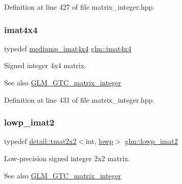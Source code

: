 Definition at line 427 of file matrix\+\_\+integer.\+hpp.

\mbox{\label{group__gtc__matrix__integer_ga367d8d5281ff82f1215a227dd2ea5ba9}} 
\subsubsection{\texorpdfstring{imat4x4}{imat4x4}}
{\footnotesize\ttfamily typedef \hyperlink{group__gtc__matrix__integer_gafa2df6be3aad055867b9bfea34e9c4a0}{mediump\+\_\+imat4x4} \hyperlink{group__gtc__matrix__integer_ga367d8d5281ff82f1215a227dd2ea5ba9}{glm\+::imat4x4}}

Signed integer 4x4 matrix. \begin{DoxySeeAlso}{See also}
\hyperlink{group__gtc__matrix__integer}{G\+L\+M\+\_\+\+G\+T\+C\+\_\+matrix\+\_\+integer} 
\end{DoxySeeAlso}


Definition at line 431 of file matrix\+\_\+integer.\+hpp.

\mbox{\label{group__gtc__matrix__integer_gae0df4bc278c1a958a32af9ac82c47630}} 
\subsubsection{\texorpdfstring{lowp\+\_\+imat2}{lowp\_imat2}}
{\footnotesize\ttfamily typedef \hyperlink{structglm_1_1detail_1_1tmat2x2}{detail\+::tmat2x2}$<$int, \hyperlink{namespaceglm_a0f04f086094c747d227af4425893f545ae161af3fc695e696ce3bf69f7332bc2d}{lowp}$>$ \hyperlink{group__gtc__matrix__integer_gae0df4bc278c1a958a32af9ac82c47630}{glm\+::lowp\+\_\+imat2}}

Low-\/precision signed integer 2x2 matrix. \begin{DoxySeeAlso}{See also}
\hyperlink{group__gtc__matrix__integer}{G\+L\+M\+\_\+\+G\+T\+C\+\_\+matrix\+\_\+integer} 
\end{DoxySeeAlso}


